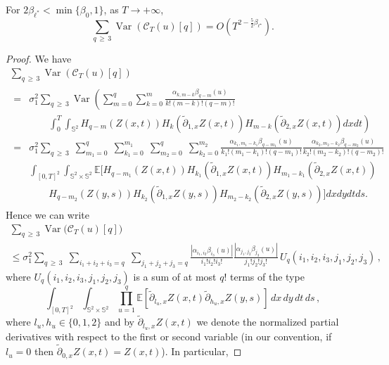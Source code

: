 \documentclass[AHL,Unicode,longabstracts,published]{cedram}
\newcommand{\clC}{\mathcal{C}}
\newcommand{\bbS}{\mathbb{S}}
\newcommand{\bbE}{\mathbb{E}}
\DeclareMathOperator{\Var}{Var}
\begin{document}
\begin{prop}\label{var-higher-chaoses}
For $2\beta_{\ell^*} < \min\{ \beta_0, 1\}$, as $T\to +\infty$,
\begin{equation*}
\sum_{q\,\geq\,3}\Var(\clC_{T}(u)[q])=O\left(T^{2-\frac52
\beta _{\ell ^{\star }}}\right).
\end{equation*}
\end{prop}

\begin{proof}
We have
\begin{multline*}
\sum_{q\,\geq\,3}\Var(\clC_{T}(u)[q]) \\
\begin{aligned}
=&\sigma _{1}^{2}\sum_{q\,\geq\,3}\Var\left(
\sum_{m=0}^{q}\sum_{k=0}^{m}\frac{\alpha _{k,m-k}\beta _{q-m}(u)}{k!(m-k)!(q-m)!}\right.\\
&\qquad\left.\int_{0}^{T}\int_{\bbS^{2}}H_{q-m}(Z(x,t))H_{k}\left(
\widetilde{\partial }_{1,x}Z(x,t)\right)H_{m-k}\left(\widetilde{\partial } _{2,x}Z(x,t)\right)dxdt\right) \\
=&\sigma _{1}^{2}\sum_{q\,\geq\,3}\;\sum_{m_{1}=0}^{q}\;\sum_{k_{1}=0}^{m_{1}}\;\sum_{m_{2}=0}^{q}\;
\sum_{k_{2}=0}^{m_{2}}\frac{\alpha _{k_{1},m_{1}-k_{1}}\beta _{q-m_{1}}(u)}{ k_{1}!(m_{1}-k_{1})!(q-m_{1})!}\frac{\alpha _{k_{2},m_{2}-k_{2}}\beta _{q-m_{2}}(u)}{k_{2}!\left(m_{2}-k_{2}\right)!\left(q-m_{2}\right)!} \\
& \int_{[0,T]^{2}}\int_{\bbS^{2}\times \bbS^{2}}
\bbE\bigg[H_{q-m_{1}}(Z(x,t))H_{k_{1}}\left(\widetilde{\partial } _{1,x}Z(x,t)\right)H_{m_{1}-k_{1}}\left(\widetilde{\partial }_{2,x}Z(x,t)\right) \\
&\qquad H_{q-m_{2}}(Z(y,s))H_{k_{2}}\left(\widetilde{\partial}_{1,x}Z(y,s)\right)H_{m_{2}-k_{2}}\left(\widetilde{\partial}_{2,x}Z(y,s)\right)
\bigg] dxdydtds.
\end{aligned}
\end{multline*}
Hence we can write
\begin{multline*}
\sum_{q\,\geq\,3}\Var\big(\clC_{T}(u)[q]\big)\\
\leq \sigma _{1}^{2}\sum_{q\,\geq\,3}\;\sum_{i_{1}+i_{2}+i_{3}=q}\;\sum_{j_{1}+j_{2}+j_{3}=q}\frac{\left|\alpha _{i_{1},i_{2}}\beta _{i_{3}}(u)\right|}{i_{1}!i_{2}!i_{3}!}\frac{\left|\alpha _{j_{1},j_{2}}\beta _{j_{3}}(u)\right|}{j_{1}!j_{2}!j_{3}!}
\,U_{q}\left(i_{1},i_{2},i_{3},j_{1},j_{2},j_{3}\right)\,,
\end{multline*}
where $U_{q}(i_{1},i_{2},i_{3},j_{1},j_{2},j_{3})$ is a sum of at most $q!$ terms of the type
\begin{equation}
\int_{[0,T]^{2}}\int_{\bbS^{2}\times \bbS ^{2}}\prod_{u=1}^{q}\bbE\left[\widetilde{\partial }_{l_{u},x}Z(x,t)
\widetilde{\partial }_{h_{u},x}Z(y,s)\right] \,dx\,dy\,dt\,ds\,,
\end{equation}
where $l_{u},h_{u}\in \{0,1,2\}$ and by $\widetilde{\partial } _{l_{u},x}Z(x,t)$ we denote the normalized partial derivatives with respect to the first or second variable (in our convention, if $l_u=0$ then $
\widetilde{\partial }_{0,x}Z(x,t)=Z(x,t)$). In particular,


\end{proof}
\end{document}
